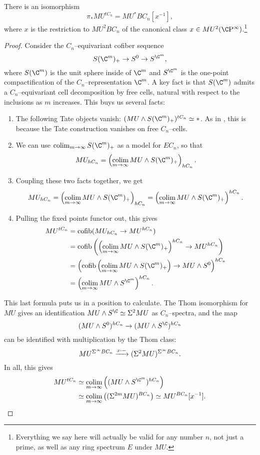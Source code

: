 \begin{theorem}\label{TateConstructionOnMU}
There is an isomorphism \[\pi_* MU^{tC_n} = MU^* BC_n[x^{-1}],\] where \(x\) is the restriction to \(MU^2 BC_n\) of the canonical class \(x \in MU^2(\CP^\infty)\).\footnote{Everything we say here will actually be valid for any number \(n\), not just a prime, as well as any ring spectrum \(E\) under \(MU\).}
\end{theorem}
\begin{proof}
Consider the \(C_n\)--equivariant cofiber sequence \[S(\C^m)_+ \to S^0 \to S^{\C^m},\] where \(S(\C^m)\) is the unit sphere inside of \(\C^m\) and \(S^{\C^m}\) is the one-point compactification of the \(C_n\)--representation \(\C^m\).  A key fact is that \(S(\C^m)\) admits a \(C_n\)--equivariant cell decomposition by free cells, natural with respect to the inclusions as \(m\) increases.  This buys us several facts:
\begin{enumerate}
    \item The following Tate objects vanish: \((MU \sm S(\C^m)_+)^{tC_n} \simeq *\).  As in , this is because the Tate construction vanishes on free \(C_n\)--cells.
    \item We can use \(\colim_{m \to \infty} S(\C^m)_+\) as a model for \(EC_n\), so that \[MU_{hC_n} = \left( \colim_{m \to \infty} MU \sm S(\C^m)_+ \right)_{hC_n}.\]
    \item Coupling these two facts together, we get \[MU_{hC_n} = \left( \colim_{m \to \infty} MU \sm S(\C^m)_+ \right)_{hC_n} = \left( \colim_{m \to \infty} MU \sm S(\C^m)_+ \right)^{hC_n}.\]
    \item Pulling the fixed points functor out, this gives
    \begin{align*}
    MU^{tC_n} & = \cofib(MU_{hC_n} \to MU^{hC_n}) \\
    & = \cofib\left(\left( \colim_{m \to \infty} MU \sm S(\C^m)_+ \right)^{hC_n} \to MU^{hC_n}\right) \\
    & = \left(\cofib\left( \colim_{m \to \infty} MU \sm S(\C^m)_+ \right) \to MU \sm S^0\right)^{hC_n} \\
    & = \left( \colim_{m \to \infty} MU \sm S^{\C^m} \right)^{hC_n}.
    \end{align*}
\end{enumerate}
This last formula puts us in a position to calculate.  The Thom isomorphism for \(MU\) gives an identification \(MU \sm S^{\C} \simeq \Susp^2 MU\) as \(C_n\)--spectra, and the map \[(MU \sm S^0)^{hC_n} \to (MU \sm S^{\C})^{hC_n}\] can be identified with multiplication by the Thom class: \[MU^{\Sigma^\infty BC_n} \xrightarrow{x \cdot -} (\Sigma^2 MU)^{\Sigma^\infty BC_n}.\]  In all, this gives
\begin{align*}
MU^{tC_n} & \simeq \colim_{m \to \infty} \left((MU \sm S^{\C^m})^{hC_n}\right) \\
& \simeq \colim_{m \to \infty} \left((\Susp^{2m} MU)^{BC_n}\right) \simeq MU^{BC_n}[x^{-1}]. \qedhere
\end{align*}
\end{proof}

